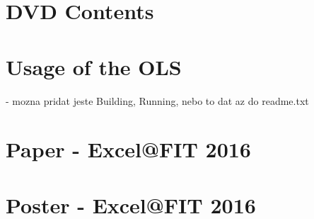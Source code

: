 \chapter{DVD Contents}

\chapter{Usage of the OLS}
- mozna pridat jeste Building, Running, nebo to dat az do readme.txt

\chapter{Paper - Excel@FIT 2016}



\chapter{Poster - Excel@FIT 2016}

